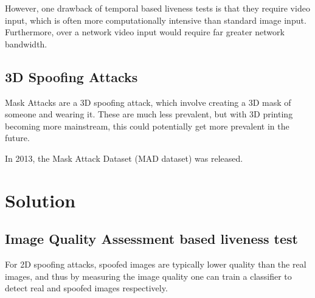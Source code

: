 \documentclass[10pt,a4paper]{article}
\begin{document}

        However, one drawback of temporal based liveness tests is that they require video input, which is often more computationally intensive than standard image input. Furthermore, over a network video input would require
        far greater network bandwidth.

        
    \subsection{3D Spoofing Attacks}
        Mask Attacks are a 3D spoofing attack, which involve creating a 3D mask of someone and wearing it. \cite{FaceSpoofingAttacksStudy} These are much less prevalent, but with 3D printing becoming more mainstream, this
        could potentially get more prevalent in the future.

        In 2013, the Mask Attack Dataset (MAD dataset) was released. \cite{3DMadDataset}



\section{Solution}
    \subsection{Image Quality Assessment based liveness test}
        For 2D spoofing attacks, spoofed images are typically lower quality than the real images, and thus by measuring the image quality
        one can train a classifier to detect real and spoofed images respectively.
\end{document}

